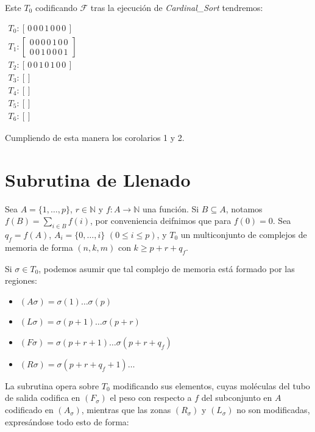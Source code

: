 \documentclass[12pt, letterpaper, twoside]{article}
\begin{document}
    Este $T_0$ codificando $\mathcal{F}$ tras la ejecución de \emph{Cardinal\_Sort} tendremos: 

        $
        \begin{array}{l}
            T_0: [\,0\,0\,0\,1\,0\,0\,0\,] \\
            T_1: \left[\begin{array}{l} 0\,0\,0\,0\,1\,0\,0 \\ 0\,0\,1\,0\,0\,0\,1 \end{array} \right] \\
            T_2: [\,0\,0\,1\,0\,1\,0\,0\,] \\
            T_3: [] \\
            T_4: [] \\
            T_5: [] \\
            T_6: [] 
        \end{array}
        $ 


    Cumpliendo de esta manera los corolarios 1 y 2.

    \newpage
    \section{Subrutina de Llenado}
    Sea $A=\{1,\dots,p\}$, $r \in \mathbb{N}$ y $f:A\rightarrow\mathbb{N}$ una función. Si $B\subseteq A$, notamos $f(B)=\sum_{i\in B}f(i)$, por conveniencia deifnimos que para $f(0)=0$. Sea $q_f=f(A)$, $A_i=\{0,\dots,i\}$ $(0\leq i\leq p)$, y $T_0$ un multiconjunto de complejos de memoria de forma $(n,k,m)$ con $k\geq p+r+q_f$.


    Si $\sigma\in T_0$, podemos asumir que tal complejo de memoria está formado por las regiones:
    \begin{multicols}{2}
        \begin{itemize}
            \item $(A\sigma )=\sigma (1)\dots\sigma (p)$
            \item $(L\sigma )=\sigma (p+1)\dots\sigma (p+r)$
            \item $(F\sigma)=\sigma(p+r+1)\dots\sigma(p+r+q_f)$
            \item $(R\sigma)=\sigma(p+r+q_f+1)\dots$
        \end{itemize} 
    \end{multicols}


    La subrutina opera sobre $T_0$ modificando sus elementos, cuyas moléculas del tubo de salida codifica en $(F_\sigma)$ el peso con respecto a $f$ del subconjunto en $A$ codificado en $(A_\sigma)$, mientras que las zonas $(R_\sigma)$ y $(L_\sigma)$ no son modificadas, expresándose todo esto de forma:
\end{document}
